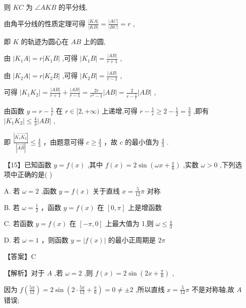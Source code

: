 \documentclass[10pt]{article}
\begin{document}
则 \({KC}\) 为 \(\angle {AKB}\) 的平分线,

由角平分线的性质定理可得 \(\frac{\left| KA\right| }{\left| KB\right| } = \frac{\left| AC\right| }{\left| BC\right| } = r\) ,

即 \(K\) 的轨迹为圆心在 \({AB}\) 上的圆,

由 \(\left| {{K}_{1}A}\right|  = r\left| {{K}_{1}B}\right|\) ,可得 \(\left| {{K}_{1}B}\right|  = \frac{\left| AB\right| }{r + 1}\) ,

由 \(\left| {{K}_{2}A}\right|  = r\left| {{K}_{2}B}\right|\) ,可得 \(\left| {{K}_{2}B}\right|  = \frac{\left| AB\right| }{r - 1}\) ,

可得 \(\left| {{K}_{1}{K}_{2}}\right|  = \frac{\left| AB\right| }{r + 1} + \frac{\left| AB\right| }{r - 1} = \frac{2r}{{r}^{2} - 1}\left| {AB}\right|  = \frac{2}{r - \frac{1}{r}}\left| {AB}\right|\) ,

由函数 \(y = r - \frac{1}{r}\) 在 \(r \in  \lbrack 2, + \infty )\) 上递增,可得 \(r - \frac{1}{r} \geq  2 - \frac{1}{2} = \frac{3}{2}\) ,即有 \(\left| {{K}_{1}{K}_{2}}\right|  \leq  \frac{4}{3}\left| {AB}\right|\) ,

即 \(\frac{\left| \overrightarrow{{K}_{1}{K}_{2}}\right| }{\left| \overrightarrow{AB}\right| } \leq  \frac{4}{3}\) ，由题意可得 \(c \geq  \frac{4}{3}\) ，故 \(c\) 的最小值为 \(\frac{4}{3}\) .

【15】已知函数 \(y = f\left( x\right)\) ,其中 \(f\left( x\right)  = 2\sin \left( {{\omega x} + \frac{\pi }{6}}\right)\) ,实数 \(\omega  > 0\) ,下列选项中正确的是( )

A. 若 \(\omega  = 2\) ,函数 \(y = f\left( x\right)\) 关于直线 \(x = \frac{5}{12}\pi\) 对称

B. 若 \(\omega  = \frac{1}{2}\) ，函数 \(y = f\left( x\right)\) 在 \(\left\lbrack  {0,\pi }\right\rbrack\) 上是增函数

C. 若函数 \(y = f\left( x\right)\) 在 \(\left\lbrack  {-\pi ,0}\right\rbrack\) 上最大值为 1,则 \(\omega  \leq  \frac{4}{3}\)

D. 若 \(\omega  = 1\) ，则函数 \(y = \left| {f\left( x\right) }\right|\) 的最小正周期是 \({2\pi }\)

【答案】C

【解析】对于 \(A\) ,若 \(\omega  = 2\) ,则 \(f\left( x\right)  = 2\sin \left( {{2x} + \frac{\pi }{6}}\right)\) ,

因为 \(f\left( \frac{5\pi }{12}\right)  = 2\sin \left( {2 \cdot  \frac{5\pi }{12} + \frac{\pi }{6}}\right)  = 0 \neq   \pm  2\) ,所以直线 \(x = \frac{5}{12}\pi\) 不是对称轴,故 \(A\) 错误;
\end{document}
